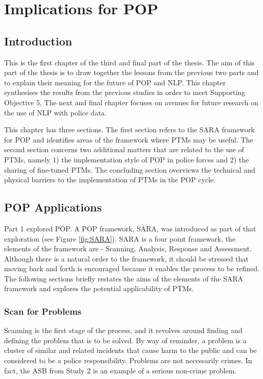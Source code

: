 \chapter{Implications for POP}


\section{Introduction} This is the first chapter of the third and final part of the thesis. The aim of this part of the thesis is to draw together the lessons from the previous two parts and to explain their meaning for the future of POP and NLP. This chapter synthesises the results from the previous studies in order to meet Supporting Objective 5,   The next and final chapter focuses on avenues for future research on the use of NLP with police data.

This chapter has three sections. The first section refers to the SARA framework for POP and identifies areas of the framework where PTMs may be useful. The second section concerns two additional matters that are related to the use of PTMs, namely 1) the implementation style of POP in police  forces and 2) the sharing of fine-tuned PTMs. The concluding section overviews the technical and physical barriers to the implementation of PTMs in the POP cycle.


\section{POP Applications} Part 1 explored POP. A POP framework, SARA, was introduced as part of that exploration (see Figure \ref{fig:SARA}). SARA is a four point framework, the elements of the framework are - Scanning, Analysis, Response and Assessment.  Although there is a natural order to the framework, it should be stressed that moving back and forth is encouraged because it enables the process to be refined. The following sections briefly restates the aims of the elements of the SARA framework and explores the potential applicability of PTMs.

\subsection{Scan for Problems} Scanning is the first stage of the process, and it revolves around finding and defining the problem that is to be solved. By way of reminder, a problem is a cluster of similar and related incidents that cause harm to the public and can be considered to be a police responsibility. Problems are not necessarily crimes. In fact, the ASB from Study 2 is an example of a  serious non-crime  problem. 

